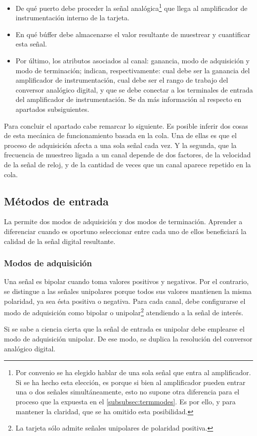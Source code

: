 \begin{itemize}
	\item De qué puerto debe proceder la señal analógica\footnote{Por convenio se ha elegido hablar de una sola señal que entra al amplificador. Si se ha hecho esta elección, es porque si bien al amplificador pueden entrar una o dos señales simultáneamente, esto no supone otra diferencia para el proceso que la expuesta en el \vref{subsubsec:termmodes}. Es por ello, y para mantener la claridad, que se ha omitido esta posibilidad.} que llega al amplificador de instrumentación interno de la tarjeta.
	\item En qué búffer debe almacenarse el valor resultante de muestrear y cuantificar esta señal.
	\item Por último, los atributos asociados al canal: ganancia, modo de adquisición y modo de terminación; indican, respectivamente: cual debe ser la ganancia del amplificador de instrumentación, cual debe ser el rango de trabajo del conversor analógico digital, y que se debe conectar a los terminales de entrada del amplificador de instrumentación. Se da más información al respecto en apartados subsiguientes.%
\end{itemize}

Para concluir el apartado cabe remarcar lo siguiente. Es posible inferir dos cosas de esta mecánica de funcionamiento basada en la cola. Una de ellas es que el proceso de adquisición afecta a una sola señal cada vez. Y la segunda, que la frecuencia de muestreo ligada a un canal depende de dos factores, de la velocidad de la señal de reloj, y de la cantidad de veces que un canal aparece repetido en la cola.


\subsection{Métodos de entrada}

La \kpci{} permite dos modos de adquisición y dos modos de terminación. Aprender a diferenciar cuando es oportuno seleccionar entre cada uno de ellos beneficiará la calidad de la señal digital resultante.


\subsubsection{Modos de adquisición}
Una señal es bipolar cuando toma valores positivos y negativos. Por el contrario, se distingue a las señales unipolares porque todos sus valores mantienen la misma polaridad, ya sea ésta positiva o negativa. Para cada canal, debe configurarse el modo de adquisición como bipolar o unipolar\footnote{La tarjeta \kpci{} sólo admite señales unipolares de polaridad positiva.} atendiendo a la señal de interés.\par
Si se sabe a ciencia cierta que la señal de entrada es unipolar debe emplearse el modo de adquisición unipolar. De ese modo, se duplica la resolución del conversor analógico digital.

